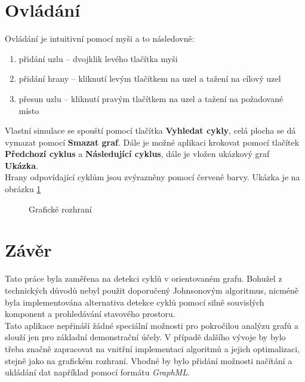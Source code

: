 \documentclass[11pt]{article}
\begin{document}
\section{Ovládání}
Ovládání je intuitivní pomocí myši a to následovně:
\begin{enumerate}
	\item přidání uzlu -- dvojklik levého tlačítka myši
	\item přidání hrany -- kliknutí levým tlačítkem na uzel a tažení na cílový uzel
	\item přesun uzlu -- kliknutí pravým tlačítkem na uzel a tažení na požadované místo  
\end{enumerate}
Vlastní simulace se spouští pomocí tlačítka \textbf{Vyhledat cykly}, celá plocha se dá vymazat pomocí \textbf{Smazat graf}. Dále je možné aplikaci krokovat pomocí tlačítek \textbf{Předchozí cyklus} a \textbf{Následující cyklus}, dále je vložen ukázkový graf \textbf{Ukázka}.\\
Hrany odpovídající cyklům jsou zvýrazněny pomocí červené barvy.
Ukázka je na obrázku \ref{gui}
\begin{figure}[h!]
\begin{center}
\caption{Grafické rozhraní}
\label{gui}
\end{center}
\end{figure} 
\section{Závěr}
Tato práce byla zaměřena na detekci cyklů v orientovaném grafu. Bohužel z technických důvodů nebyl použit doporučený Johnsonovým algoritmus, nicméně byla implementována alternativa detekce cyklů pomocí silně souvislých komponent a prohledávání stavového prostoru.\\ Tato aplikace nepřináší žádné speciální možnosti pro pokročilou analýzu grafů a slouží jen pro základní demonstrační účely. V případě dalšího vývoje by bylo třeba značně zapracovat na vnitřní implementaci algoritmů a jejich optimalizaci, stejně jako na grafickém rozhraní. Vhodné by bylo přidání možnosti načítání a ukládání dat například pomocí formátu \textit{GraphML}.
\newpage

\end{document}
